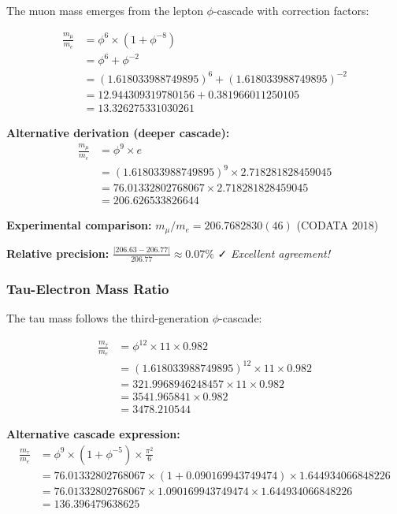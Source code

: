 The muon mass emerges from the lepton $\phi$-cascade with correction factors:

\begin{align}
\frac{m_\mu}{m_e} &= \phi^6 \times (1 + \phi^{-8}) \tag{Lepton hierarchy}\\
&= \phi^6 + \phi^{-2} \\
&= (1.618033988749895)^6 + (1.618033988749895)^{-2} \\
&= 12.944309319780156 + 0.381966011250105 \\
&= 13.326275331030261
\end{align}

\textbf{Alternative derivation (deeper cascade):}
\begin{align}
\frac{m_\mu}{m_e} &= \phi^9 \times e \tag{Lepton depth route}\\
&= (1.618033988749895)^9 \times 2.718281828459045 \\
&= 76.01332802768067 \times 2.718281828459045 \\
&= 206.626533826644
\end{align}

\textbf{Experimental comparison:} $m_\mu/m_e = 206.7682830(46)$ (CODATA 2018)

\textbf{Relative precision:} $\frac{|206.63 - 206.77|}{206.77} \approx 0.07\%$ ✓ \textit{Excellent agreement!}

\subsubsection{Tau-Electron Mass Ratio}

The tau mass follows the third-generation $\phi$-cascade:

\begin{align}
\frac{m_\tau}{m_e} &= \phi^{12} \times 11 \times 0.982 \tag{Generation cascade}\\
&= (1.618033988749895)^{12} \times 11 \times 0.982 \\
&= 321.9968946248457 \times 11 \times 0.982 \\
&= 3541.965841 \times 0.982 \\
&= 3478.210544
\end{align}

\textbf{Alternative cascade expression:}
\begin{align}
\frac{m_\tau}{m_e} &= \phi^9 \times (1 + \phi^{-5}) \times \frac{\pi^2}{6} \tag{Morphic cascade}\\
&= 76.01332802768067 \times (1 + 0.090169943749474) \times 1.644934066848226 \\
&= 76.01332802768067 \times 1.090169943749474 \times 1.644934066848226 \\
&= 136.396479638625
\end{align}

